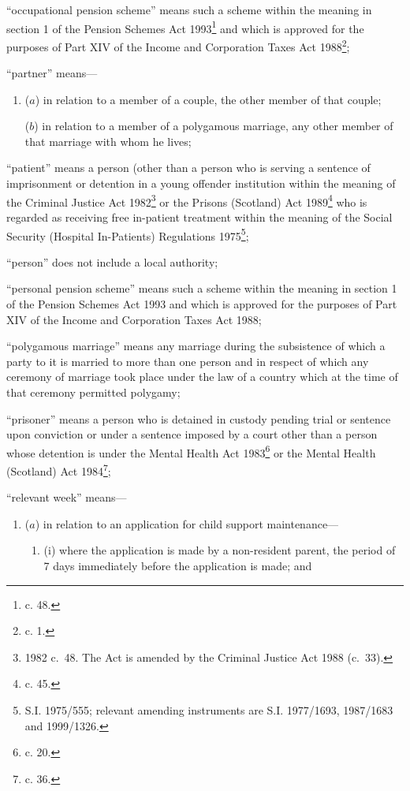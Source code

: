 \documentclass[12pt,a4paper]{article}
\begin{document}
\begin{enumerate}
“occupational pension scheme” means such a scheme within the meaning in section 1 of the Pension Schemes Act 1993\footnote{ c. 48.} and which is approved for the purposes of Part XIV of the Income and Corporation Taxes Act 1988\footnote{ c. 1.};

“partner” means—
\begin{enumerate}\item[]
($a$) 
in relation to a member of a couple, the other member of that couple;

($b$) 
in relation to a member of a polygamous marriage, any other member of that marriage with whom he lives;
\end{enumerate}

“patient” means a person (other than a person who is serving a sentence of imprisonment or detention in a young offender institution within the meaning of the Criminal Justice Act 1982\footnote{1982 c.\ 48. The Act is amended by the Criminal Justice Act 1988 (c.\ 33).} or the Prisons (Scotland) Act 1989\footnote{ c. 45.} who is regarded as receiving free in-patient treatment within the meaning of the Social Security (Hospital In-Patients) Regulations 1975\footnote{\frenchspacing S.I. 1975/555; relevant amending instruments are S.I. 1977/1693, 1987/1683 and 1999/1326.};

“person” does not include a local authority;

“personal pension scheme” means such a scheme within the meaning in section 1 of the Pension Schemes Act 1993 and which is approved for the purposes of Part XIV of the Income and Corporation Taxes Act 1988;

“polygamous marriage” means any marriage during the subsistence of which a party to it is married to more than one person and in respect of which any ceremony of marriage took place under the law of a country which at the time of that ceremony permitted polygamy;

“prisoner” means a person who is detained in custody pending trial or sentence upon conviction or under a sentence imposed by a court other than a person whose detention is under the Mental Health Act 1983\footnote{ c. 20.} or the Mental Health (Scotland) Act 1984\footnote{ c. 36.};

“relevant week” means—
\begin{enumerate}\item[]
($a$) 
in relation to an application for child support maintenance—
\begin{enumerate}\item[]
(i)
where the application is made by a non-resident parent, the period of 7 days immediately before the application is made; and


\end{enumerate}
\end{enumerate}
\end{enumerate}
\end{document}
